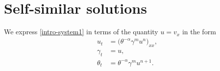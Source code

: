 \documentclass[usletter,11pt]{article}
\theoremstyle{remark}
\begin{document}
\section{Self-similar solutions} \label{sec:scale}

We express \eqref{intro-system1} in terms of the quantity $u=v_x$ in the form
\begin{equation} 
\label{intro-system2}
\begin{aligned}
u_t &= \big ( \theta^{-\alpha}\gamma^m u^n \big )_{xx} , \\
 \gamma_t &= u ,\\
 \theta_t &= \theta^{-\alpha}\gamma^m u^{n+1} .\\
\end{aligned}
\end{equation}
\end{document}
